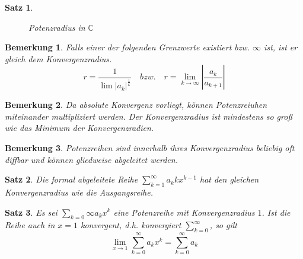 \documentclass[12pt,a4paper]{report}%
\newtheorem{satz}{Satz}[section]
\newtheorem{bem}{Bemerkung}[section]
\numberwithin{equation}{section}
\newcommand{\C}{\mathbb{C}}
\numberwithin{equation}{subsection}
\begin{document}
\begin{satz}
\begin{figure}[H]
\begin{minipage}{.5\textwidth}
				  \caption{Potenzradius in $\C$ \protect\cite{HM12}}
				  \label{fig:reihe_potenzradius_c}
				\end{minipage}
      \end{figure}
	  \end{satz}
    \begin{bem}
      Falls einer der folgenden Grenzwerte existiert bzw. $\infty$ ist, ist er gleich dem Konvergenzradius.
      \begin{equation*}
        r = \frac{1}{\lim |a_k|^\frac{1}{k}} \quad bzw. \quad r = \lim\limits_{k \rightarrow \infty} \left| \frac{a_k}{a_{k+1}}\right|
      \end{equation*}
    \end{bem}	  
    \begin{bem}
      Da absolute Konvergenz vorliegt, können Potenzreiuhen miteinander multipliziert werden. Der Konvergenzradius ist mindestens so groß wie das Minimum der Konvergenzradien.
    \end{bem}
	  \begin{bem}
	    Potenzreihen sind innerhalb ihres Konvergenzradius beliebig oft diffbar und können gliedweise abgeleitet werden.
	  \end{bem}
	  \begin{satz}
	    Die formal abgeleitete Reihe $\sum\limits_{k = 1}^\infty a_k kx^{k-1}$ hat den gleichen Konvergenzradius wie die Ausgangsreihe.
	  \end{satz}
	  \begin{satz}
	    Es sei $\sum\limits_{k=0}\infty a_k x^k$ eine Potenzreihe mit Konvergenzradius $1$. Ist die Reihe auch in $x = 1$ konvergent, d.h. konvergiert $\sum\limits_{k = 0}^\infty$, so gilt
	    \begin{equation}
	      \lim\limits_{x\rightarrow 1} \sum\limits_{k = 0}^\infty a_k x^k = \sum\limits_ {k = 0}^\infty a_k
	    \end{equation}
	  \end{satz}
\newpage	  
	  
\end{document}
